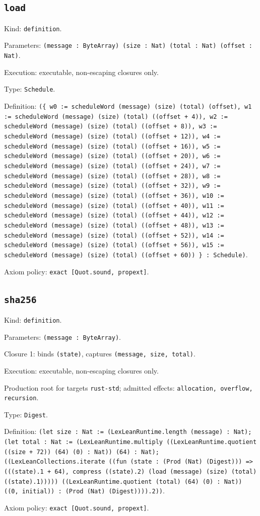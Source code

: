 \documentclass[11pt]{article}
\begin{document}
\subsection*{\texttt{load}}
\noindent Kind: \texttt{definition}.\par
\noindent Parameters: \texttt{(message : ByteArray) (size : Nat) (total : Nat) (offset : Nat)}.\par
\noindent Execution: executable, non-escaping closures only.\par
\noindent Type: \texttt{Schedule}.\par
\noindent Definition: \texttt{(\{ w0 := scheduleWord (message) (size) (total) (offset), w1 := scheduleWord (message) (size) (total) ((offset + 4)), w2 := scheduleWord (message) (size) (total) ((offset + 8)), w3 := scheduleWord (message) (size) (total) ((offset + 12)), w4 := scheduleWord (message) (size) (total) ((offset + 16)), w5 := scheduleWord (message) (size) (total) ((offset + 20)), w6 := scheduleWord (message) (size) (total) ((offset + 24)), w7 := scheduleWord (message) (size) (total) ((offset + 28)), w8 := scheduleWord (message) (size) (total) ((offset + 32)), w9 := scheduleWord (message) (size) (total) ((offset + 36)), w10 := scheduleWord (message) (size) (total) ((offset + 40)), w11 := scheduleWord (message) (size) (total) ((offset + 44)), w12 := scheduleWord (message) (size) (total) ((offset + 48)), w13 := scheduleWord (message) (size) (total) ((offset + 52)), w14 := scheduleWord (message) (size) (total) ((offset + 56)), w15 := scheduleWord (message) (size) (total) ((offset + 60)) \} : Schedule)}.\par
\noindent Axiom policy: \texttt{exact [Quot.sound, propext]}.\par
\subsection*{\texttt{sha256}}
\noindent Kind: \texttt{definition}.\par
\noindent Parameters: \texttt{(message : ByteArray)}.\par
\noindent Closure 1: binds \texttt{(state)}, captures \texttt{(message, size, total)}.\par
\noindent Execution: executable, non-escaping closures only.\par
\noindent Production root for targets \texttt{rust-std}; admitted effects: \texttt{allocation, overflow, recursion}.\par
\noindent Type: \texttt{Digest}.\par
\noindent Definition: \texttt{(let size : Nat := (LexLeanRuntime.length (message) : Nat); (let total : Nat := (LexLeanRuntime.multiply ((LexLeanRuntime.quotient ((size + 72)) (64) (0) : Nat)) (64) : Nat); ((LexLeanCollections.iterate ((fun (state : (Prod (Nat) (Digest))) => (((state).1 + 64), compress ((state).2) (load (message) (size) (total) ((state).1))))) ((LexLeanRuntime.quotient (total) (64) (0) : Nat)) ((0, initial)) : (Prod (Nat) (Digest)))).2))}.\par
\noindent Axiom policy: \texttt{exact [Quot.sound, propext]}.\par
\end{document}
